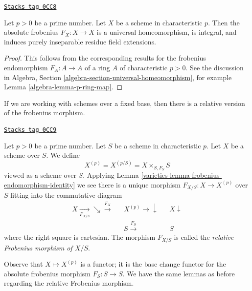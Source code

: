 \begin{lemma}[Frobenius]
\label{varieties-lemma-frobenius}
\href{https://stacks.math.columbia.edu/tag/0CC8}{\texttt{Stacks tag 0CC8}}

Let $p > 0$ be a prime number. Let $X$ be a scheme in characteristic $p$.
Then the absolute frobenius $F_X : X \to X$
is a universal homeomorphism, is integral, and
induces purely inseparable residue field extensions.
\end{lemma}

\begin{proof}
This follows from the corresponding results for the frobenius endomorphism
$F_A : A \to A$ of a ring $A$ of characteristic $p > 0$. See the
discussion in Algebra, Section \ref{algebra-section-universal-homeomorphism},
for example Lemma \ref{algebra-lemma-p-ring-map}.
\end{proof}

If we are working with schemes over a fixed base, then there is a
relative version of the frobenius morphism.

\begin{definition}
\label{varieties-definition-relative-frobenius}
\href{https://stacks.math.columbia.edu/tag/0CC9}{\texttt{Stacks tag 0CC9}}

Let $p > 0$ be a prime number. Let $S$ be a scheme in characteristic $p$.
Let $X$ be a scheme over $S$. We define
$$
X^{(p)} = X^{(p/S)} = X \times_{S, F_S} S
$$
viewed as a scheme over $S$. Applying
Lemma \ref{varieties-lemma-frobenius-endomorphism-identity}
we see there is a unique morphism $F_{X/S} : X \longrightarrow X^{(p)}$
over $S$ fitting into the commutative diagram
$$
\begin{array}{ccccc}X \underset{F_{X/S}}{\longrightarrow}\searrow\overset{F_X}{\longrightarrow} &  & X^{(p)} \longrightarrow\downarrow &  & X \downarrow \\  &  & S \overset{F_S}{\longrightarrow} &  & S\end{array}
$$
where the right square is cartesian. The morphism $F_{X/S}$ is called the
{\it relative Frobenius morphism of $X/S$}.
\end{definition}

Observe that $X \mapsto X^{(p)}$ is a functor; it is the base change
functor for the absolute frobenius morphism $F_S : S \to S$.
We have the same lemmas as before regarding the relative Frobenius morphism.

